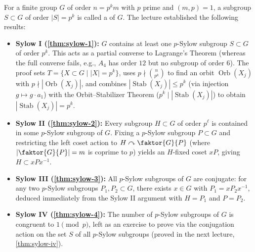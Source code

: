 \begin{overview}
For a finite group $G$ of order $n = p^k m$ with $p$ prime and $(m, p) = 1$, a subgroup $S \subset G$ of order $|S| = p^k$ is called a  of $G$. The lecture established the following results:
\begin{itemize}
    \item \textbf{Sylow I (\cref{thm:sylow-1}):} $G$ contains at least one $p$-Sylow subgroup $S \subset G$ of order $p^k$. This acts as a partial converse to Lagrange's Theorem (whereas the full converse fails, e.g., $A_4$ has order $12$ but no subgroup of order $6$). The proof sets $T = \{ X \subset G \mid |X| = p^k \}$, uses $p \nmid \binom{n}{p^k}$ to find an orbit $\operatorname{Orb}(X_j)$ with $p \nmid |\operatorname{Orb}(X_j)|$, and combines $|\operatorname{Stab}(X_j)| \le p^k$ (via injection $g \mapsto g \cdot a_1$) with the Orbit--Stabilizer Theorem ($p^k \mid |\operatorname{Stab}(X_j)|$) to obtain $|\operatorname{Stab}(X_j)| = p^k$.
    \item \textbf{Sylow II (\cref{thm:sylow-2}):} Every subgroup $H \subset G$ of order $p^\ell$ is contained in some $p$-Sylow subgroup of $G$. Fixing a $p$-Sylow subgroup $P \subset G$ and restricting the left coset action to $H \curvearrowright \faktor{G}{P}$ (where $|\faktor{G}{P}| = m$ is coprime to $p$) yields an $H$-fixed coset $x P$, giving $H \subset x P x^{-1}$.
    \item \textbf{Sylow III (\cref{thm:sylow-3}):} All $p$-Sylow subgroups of $G$ are conjugate: for any two $p$-Sylow subgroups $P_1, P_2 \subset G$, there exists $x \in G$ with $P_1 = x P_2 x^{-1}$, deduced immediately from the Sylow II argument with $H = P_1$ and $P = P_2$.
    \item \textbf{Sylow IV (\cref{thm:sylow-4}):} The number of $p$-Sylow subgroups of $G$ is congruent to $1 \pmod p$, left as an exercise to prove via the conjugation action on the set $S$ of all $p$-Sylow subgroups (proved in the next lecture, \cref{thm:sylow-iv}).
\end{itemize}
\end{overview}